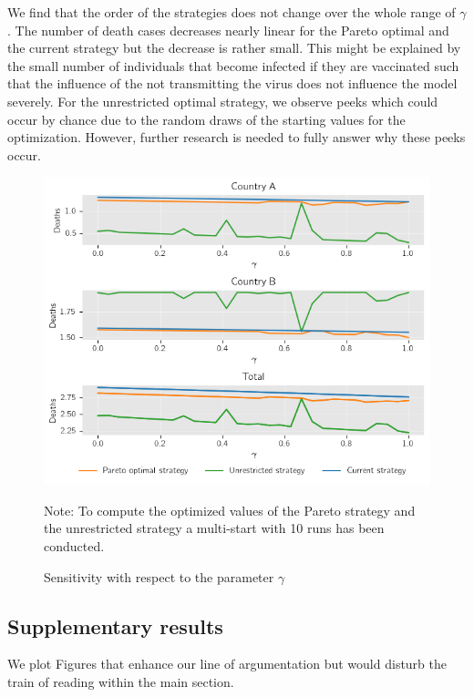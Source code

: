 We find that the order of the strategies does not change over the whole range of $\gamma$. The number of death cases decreases nearly linear for the Pareto optimal and the current strategy but the decrease is rather small. This might be explained by the small number of individuals that become infected if they are vaccinated such that the influence of the not transmitting the virus does not influence the model severely. For the unrestricted optimal strategy, we observe peeks which could occur by chance due to the random draws of the starting values for the optimization. However, further research is needed to fully answer why these peeks occur.


\begin{figure}[h!]
\centering
\includegraphics[scale=0.59]{images/sensitivity_gamma.png}
\begin{flushleft}
\scriptsize{Note:} To compute the optimized values of the Pareto strategy and the unrestricted strategy a multi-start with 10 runs has been conducted.
\end{flushleft}
\caption{Sensitivity with respect to the parameter $\gamma$}
\label{fig:sensitivity_gamma}
\end{figure}


\clearpage


\subsection{Supplementary results}
We plot Figures that enhance our line of argumentation but would disturb the train of reading within the main section.
